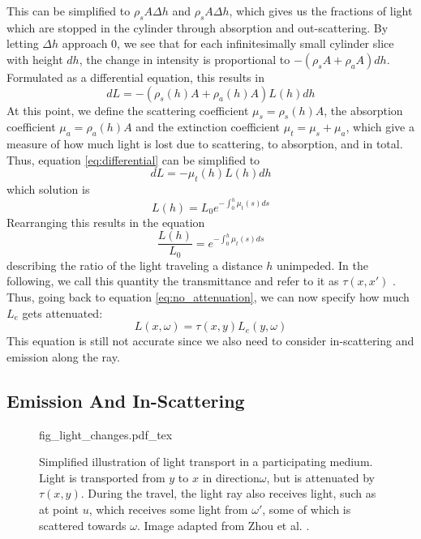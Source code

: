 This can be simplified to ${\rho}_sA{\Delta}h$ and ${\rho}_sA{\Delta}h$, which gives us the fractions of light which are stopped in the cylinder through absorption and out-scattering. By letting $\Delta h$ approach 0, we see that for each infinitesimally small cylinder slice with height $dh$, the change in intensity is proportional to $-({\rho}_sA + {\rho}_aA)dh$.
Formulated as a differential equation, this results in
\begin{equation} \label{eq:differential}
dL = -({\rho}_s(h)A + {\rho}_a(h)A)L(h)dh
\end{equation}
At this point, we define the scattering coefficient ${\mu}_s ={\rho}_s(h)A $, the absorption coefficient ${\mu}_a = {\rho}_a(h)A$ and the extinction coefficient ${\mu}_t = {\mu}_s +{\mu}_a$, which give a measure of how much light is lost due to scattering, to absorption, and in total. Thus, equation \ref{eq:differential} can be simplified to
\begin{equation}
dL = - {\mu}_t(h)L(h)dh
\end{equation}
which solution is
\begin{equation}
L(h) = L_0e^{-\int_{0}^{h} {\mu}_t(s)ds}
\end{equation}
Rearranging this results in the equation
\begin{equation}
\frac{L(h)}{L_0} = e^{-\int_{0}^{h} {\mu}_t(s)ds}
\end{equation}
describing the ratio of the light traveling a distance $h$ unimpeded. In the following, we call this quantity the transmittance and refer to it as $\tau({x}, {x'})$ .
Thus, going back to equation \ref{eq:no_attenuation}, we can now specify how much $L_e$ gets attenuated:
\begin{equation}
L({x},\omega ) =\tau({x}, {y}) L_e({y}, \omega )
\end{equation}
This equation is still not accurate since we also need to consider in-scattering and emission along the ray.
\subsection{Emission And In-Scattering}


\begin{figure}
\centering
\def\svgwidth{\columnwidth}
{fig_light_changes.pdf_tex}

\caption{Simplified illustration of light transport in a participating medium. Light is transported from $y$ to $x$ in direction$\omega$, but is attenuated by $\tau(x,y)$. During the travel, the light ray also receives light, such as at point $u$, which receives some light from $\omega'$, some of which is scattered towards $\omega$. Image adapted from Zhou et al. \cite{zhou2007real-time}.}
\label{fig:light_changes}
\end{figure}


